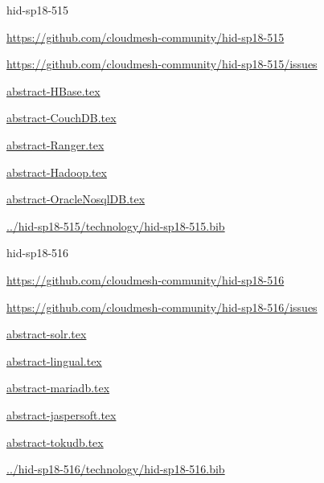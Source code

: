 \begin{IU}

hid-sp18-515

\url{https://github.com/cloudmesh-community/hid-sp18-515}

\url{https://github.com/cloudmesh-community/hid-sp18-515/issues}

\href{https://github.com/cloudmesh-community/hid-sp18-515/blob/master//technology/abstract-HBase.tex}{abstract-HBase.tex}

\href{https://github.com/cloudmesh-community/hid-sp18-515/blob/master//technology/abstract-CouchDB.tex}{abstract-CouchDB.tex}

\href{https://github.com/cloudmesh-community/hid-sp18-515/blob/master//technology/abstract-Ranger.tex}{abstract-Ranger.tex}

\href{https://github.com/cloudmesh-community/hid-sp18-515/blob/master//technology/abstract-Hadoop.tex}{abstract-Hadoop.tex}

\href{https://github.com/cloudmesh-community/hid-sp18-515/blob/master//technology/abstract-OracleNosqlDB.tex}{abstract-OracleNosqlDB.tex}

\href{https://github.com/cloudmesh-community/hid-sp18-515/blob/master//technology/hid-sp18-515.bib}{../hid-sp18-515/technology/hid-sp18-515.bib}

\end{IU}


\begin{IU}

hid-sp18-516

\url{https://github.com/cloudmesh-community/hid-sp18-516}

\url{https://github.com/cloudmesh-community/hid-sp18-516/issues}

\href{https://github.com/cloudmesh-community/hid-sp18-516/blob/master//technology/abstract-solr.tex}{abstract-solr.tex}

\href{https://github.com/cloudmesh-community/hid-sp18-516/blob/master//technology/abstract-lingual.tex}{abstract-lingual.tex}

\href{https://github.com/cloudmesh-community/hid-sp18-516/blob/master//technology/abstract-mariadb.tex}{abstract-mariadb.tex}

\href{https://github.com/cloudmesh-community/hid-sp18-516/blob/master//technology/abstract-jaspersoft.tex}{abstract-jaspersoft.tex}

\href{https://github.com/cloudmesh-community/hid-sp18-516/blob/master//technology/abstract-tokudb.tex}{abstract-tokudb.tex}

\href{https://github.com/cloudmesh-community/hid-sp18-516/blob/master//technology/hid-sp18-516.bib}{../hid-sp18-516/technology/hid-sp18-516.bib}

\end{IU}


